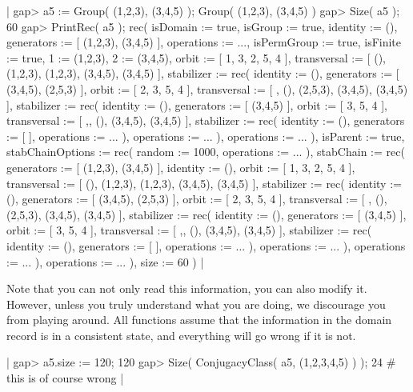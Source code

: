 |    gap> a5 := Group( (1,2,3), (3,4,5) );
    Group( (1,2,3), (3,4,5) )
    gap> Size( a5 );
    60
    gap> PrintRec( a5 );
    rec(
      isDomain         := true,
      isGroup          := true,
      identity         := (),
      generators       := [ (1,2,3), (3,4,5) ],
      operations       := ...,
      isPermGroup      := true,
      isFinite         := true,
      1                := (1,2,3),
      2                := (3,4,5),
      orbit            := [ 1, 3, 2, 5, 4 ],
      transversal      := [ (), (1,2,3), (1,2,3), (3,4,5), (3,4,5) ],
      stabilizer       := rec(
        identity    := (),
        generators  := [ (3,4,5), (2,5,3) ],
        orbit       := [ 2, 3, 5, 4 ],
        transversal := [ , (), (2,5,3), (3,4,5), (3,4,5) ],
        stabilizer  := rec(
          identity    := (),
          generators  := [ (3,4,5) ],
          orbit       := [ 3, 5, 4 ],
          transversal := [ ,, (), (3,4,5), (3,4,5) ],
          stabilizer  := rec(
            identity   := (),
            generators := [  ],
            operations := ... ),
          operations  := ... ),
        operations  := ... ),
      isParent         := true,
      stabChainOptions := rec(
        random     := 1000,
        operations := ... ),
      stabChain        := rec(
        generators  := [ (1,2,3), (3,4,5) ],
        identity    := (),
        orbit       := [ 1, 3, 2, 5, 4 ],
        transversal := [ (), (1,2,3), (1,2,3), (3,4,5), (3,4,5) ],
        stabilizer  := rec(
          identity    := (),
          generators  := [ (3,4,5), (2,5,3) ],
          orbit       := [ 2, 3, 5, 4 ],
          transversal := [ , (), (2,5,3), (3,4,5), (3,4,5) ],
          stabilizer  := rec(
            identity    := (),
            generators  := [ (3,4,5) ],
            orbit       := [ 3, 5, 4 ],
            transversal := [ ,, (), (3,4,5), (3,4,5) ],
            stabilizer  := rec(
              identity   := (),
              generators := [  ],
              operations := ... ),
            operations  := ... ),
          operations  := ... ),
        operations  := ... ),
      size             := 60 ) |

Note that you can not only read this information, you can also modify it.
However, unless you  truly understand what  you are doing,  we discourage
you  from   playing around.     All  {\GAP}  functions   assume  that the
information in the domain record is in a consistent state, and everything
will go wrong if it is not.

|    gap> a5.size := 120;
    120
    gap> Size( ConjugacyClass( a5, (1,2,3,4,5) ) );
    24    # this is of course wrong |


